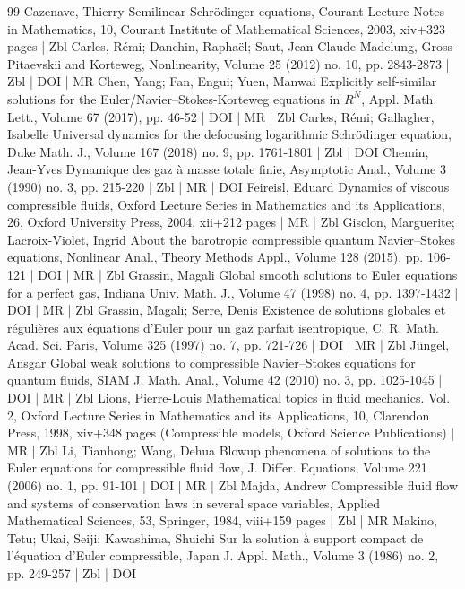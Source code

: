 \documentclass[10pt]{amsart}
\theoremstyle{definition}\newtheorem{defi}[theo]{Definition}\newtheorem{rema}[theo]{Remark}\newtheorem{exam}[theo]{Example}\newtheorem{exem}[theo]{Example}\newtheorem{nota}[theo]{Notation}
\newcommand*\<{\left\langle}
\renewcommand*\>{\right\rangle}
\begin{document}
\begin{thebibliography}{99}
Cazenave, Thierry Semilinear Schrödinger equations, Courant Lecture Notes in Mathematics, 10, Courant Institute of Mathematical Sciences, 2003, xiv+323 pages | Zbl
Carles, Rémi; Danchin, Raphaël; Saut, Jean-Claude Madelung, Gross-Pitaevskii and Korteweg, Nonlinearity, Volume 25 (2012) no. 10, pp. 2843-2873 | Zbl | DOI | MR
Chen, Yang; Fan, Engui; Yuen, Manwai Explicitly self-similar solutions for the Euler/Navier–Stokes-Korteweg equations in ${R}^{N}$, Appl. Math. Lett., Volume 67 (2017), pp. 46-52 | DOI | MR | Zbl
Carles, Rémi; Gallagher, Isabelle Universal dynamics for the defocusing logarithmic Schrödinger equation, Duke Math. J., Volume 167 (2018) no. 9, pp. 1761-1801 | Zbl | DOI
Chemin, Jean-Yves Dynamique des gaz à masse totale finie, Asymptotic Anal., Volume 3 (1990) no. 3, pp. 215-220 | Zbl | MR | DOI
Feireisl, Eduard Dynamics of viscous compressible fluids, Oxford Lecture Series in Mathematics and its Applications, 26, Oxford University Press, 2004, xii+212 pages | MR | Zbl
Gisclon, Marguerite; Lacroix-Violet, Ingrid About the barotropic compressible quantum Navier–Stokes equations, Nonlinear Anal., Theory Methods Appl., Volume 128 (2015), pp. 106-121 | DOI | MR | Zbl
Grassin, Magali Global smooth solutions to Euler equations for a perfect gas, Indiana Univ. Math. J., Volume 47 (1998) no. 4, pp. 1397-1432 | DOI | MR | Zbl
Grassin, Magali; Serre, Denis Existence de solutions globales et régulières aux équations d’Euler pour un gaz parfait isentropique, C. R. Math. Acad. Sci. Paris, Volume 325 (1997) no. 7, pp. 721-726 | DOI | MR | Zbl
Jüngel, Ansgar Global weak solutions to compressible Navier–Stokes equations for quantum fluids, SIAM J. Math. Anal., Volume 42 (2010) no. 3, pp. 1025-1045 | DOI | MR | Zbl
Lions, Pierre-Louis Mathematical topics in fluid mechanics. Vol. 2, Oxford Lecture Series in Mathematics and its Applications, 10, Clarendon Press, 1998, xiv+348 pages (Compressible models, Oxford Science Publications) | MR | Zbl
Li, Tianhong; Wang, Dehua Blowup phenomena of solutions to the Euler equations for compressible fluid flow, J. Differ. Equations, Volume 221 (2006) no. 1, pp. 91-101 | DOI | MR | Zbl
Majda, Andrew Compressible fluid flow and systems of conservation laws in several space variables, Applied Mathematical Sciences, 53, Springer, 1984, viii+159 pages | Zbl | MR
Makino, Tetu; Ukai, Seiji; Kawashima, Shuichi Sur la solution à support compact de l’équation d’Euler compressible, Japan J. Appl. Math., Volume 3 (1986) no. 2, pp. 249-257 | Zbl | DOI

\end{thebibliography}
\end{document}
